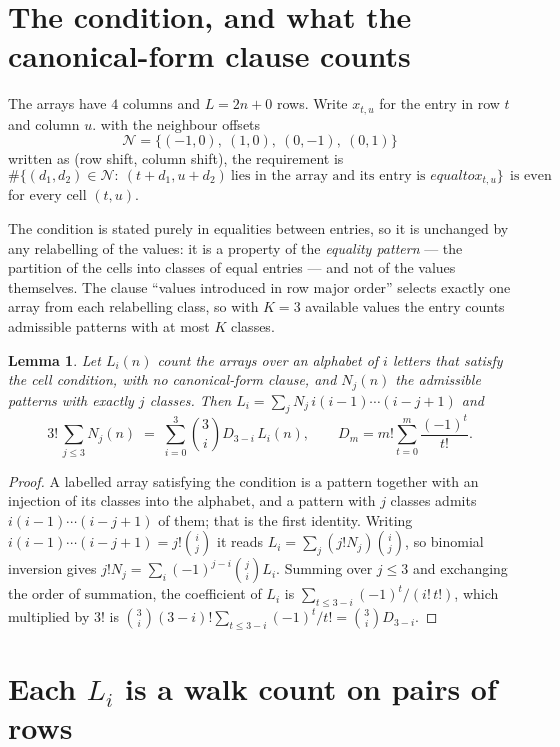 \documentclass[11pt,a4paper]{article}
\theoremstyle{plain}
\newtheorem{lemma}[theorem]{Lemma}
\theoremstyle{definition}
\begin{document}
\section{The condition, and what the canonical-form clause counts}

The arrays have $4$ columns and $L=2n+0$ rows. Write $x_{t,u}$ for the entry in
row $t$ and column $u$. with the neighbour offsets
\[
\mathcal N=\{(-1,0),\ (1,0),\ (0,-1),\ (0,1)\}
\]
written as (row shift, column shift), the requirement is
\begin{equation}\label{eq:loc}
\#\bigl\{(d_1,d_2)\in\mathcal N:\ (t+d_1,u+d_2)\ \text{lies in the array and its entry is }
equal to x_{t,u}\bigr\}\ \ \text{is even}
\end{equation}
for every cell $(t,u)$.

The condition is stated purely in equalities between entries, so it is unchanged by any
relabelling of the values: it is a property of the \emph{equality pattern} --- the partition
of the cells into classes of equal entries --- and not of the values themselves. The clause
``values introduced in row major order'' selects exactly one array from each relabelling
class, so with $K=3$ available values the entry counts admissible patterns with at most $K$
classes.

\begin{lemma}\label{lem:inv}
Let $L_i(n)$ count the arrays over an alphabet of $i$ letters that satisfy the cell
condition, with no canonical-form clause, and $N_j(n)$ the admissible patterns with exactly
$j$ classes. Then $L_i=\sum_j N_j\,i(i-1)\cdots(i-j+1)$ and
\[
3!\,\sum_{j\le 3}N_j(n)\;=\;\sum_{i=0}^{3}\binom{3}{i}D_{3-i}\,L_i(n),
\qquad D_m=m!\sum_{t=0}^{m}\frac{(-1)^t}{t!} .
\]
\end{lemma}

\begin{proof}
A labelled array satisfying the condition is a pattern together with an injection of its
classes into the alphabet, and a pattern with $j$ classes admits $i(i-1)\cdots(i-j+1)$ of
them; that is the first identity. Writing $i(i-1)\cdots(i-j+1)=j!\binom{i}{j}$ it reads
$L_i=\sum_j(j!N_j)\binom{i}{j}$, so binomial inversion gives
$j!N_j=\sum_i(-1)^{j-i}\binom{j}{i}L_i$. Summing over $j\le3$ and exchanging the
order of summation, the coefficient of $L_i$ is
$\sum_{t\le3-i}(-1)^t/(i!\,t!)$, which multiplied by $3!$ is
$\binom{3}{i}(3-i)!\sum_{t\le3-i}(-1)^t/t!=\binom{3}{i}D_{3-i}$.
\end{proof}

\section{Each $L_i$ is a walk count on pairs of rows}
\end{document}
